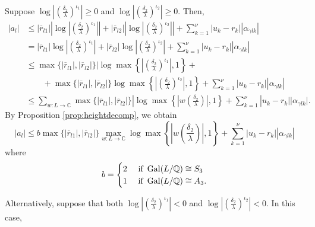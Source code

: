 Suppose $\log\left|\left(\frac{\delta_2}{\lambda}\right)^{\iota_1}\right| \geq 0$ and $\log\left|\left(\frac{\delta_2}{\lambda}\right)^{\iota_2}\right| \geq 0$. Then, 
\begin{align*}
|a_l| 	& \leq |\overline{r}_{l1}|\left|\log\left|\left(\frac{\delta_2}{\lambda}\right)^{\iota_1}\right|\right| + |\overline{r}_{l2}|\left|\log\left|\left(\frac{\delta_2}{\lambda}\right)^{\iota_2}\right|\right| + \sum_{k=1}^{\nu}|u_k-r_k||\alpha_{\gamma l k}|\\
	& = |\overline{r}_{l1}|\log\left|\left(\frac{\delta_2}{\lambda}\right)^{\iota_1}\right| + |\overline{r}_{l2}|\log\left|\left(\frac{\delta_2}{\lambda}\right)^{\iota_2}\right| + \sum_{k=1}^{\nu}|u_k-r_k||\alpha_{\gamma l k}|\\
	& \leq \max\{|\overline{r}_{l1}|, |\overline{r}_{l2}|\}|\log\max\left\{\left|\left(\frac{\delta_2}{\lambda}\right)^{\iota_1}\right|,1\right\} + \\
	& \quad \quad +\max\{|\overline{r}_{l1}|, |\overline{r}_{l2}|\}\log\max\left\{\left|\left(\frac{\delta_2}{\lambda}\right)^{\iota_2}\right|,1\right\} + \sum_{k=1}^{\nu}|u_k-r_k||\alpha_{\gamma l k}|\\
	&  \leq \sum_{w: L \to \mathbb{C}}\max\{|\overline{r}_{l1}|, |\overline{r}_{l2}|\}|\log\max\left\{\left|w\left(\frac{\delta_2}{\lambda}\right)\right|,1\right\} + \sum_{k=1}^{\nu}|u_k-r_k||\alpha_{\gamma l k}|.
\end{align*}
By Proposition \ref{prop:heightdecomp}, we obtain
\[|a_l| \leq b\max\{|\overline{r}_{l1}|, |\overline{r}_{l2}|\}\max_{w:L\to \mathbb{C}} \log \max \left\{ \left|w\left(\frac{\delta_2}{\lambda}\right)\right|, 1\right\} +  \sum_{k=1}^{\nu}|u_k-r_k||\alpha_{\gamma l k}|\]
where
\[b =
\begin{cases}
2 & \text{ if } \operatorname{Gal}(L/\mathbb{Q}) \cong S_3\\
1 & \text{ if } \operatorname{Gal}(L/\mathbb{Q}) \cong A_3.
\end{cases}\]

Alternatively, suppose that both $\log\left|\left(\frac{\delta_2}{\lambda}\right)^{\iota_1}\right| < 0$ and $\log\left|\left(\frac{\delta_2}{\lambda}\right)^{\iota_2}\right| < 0$. In this case,

